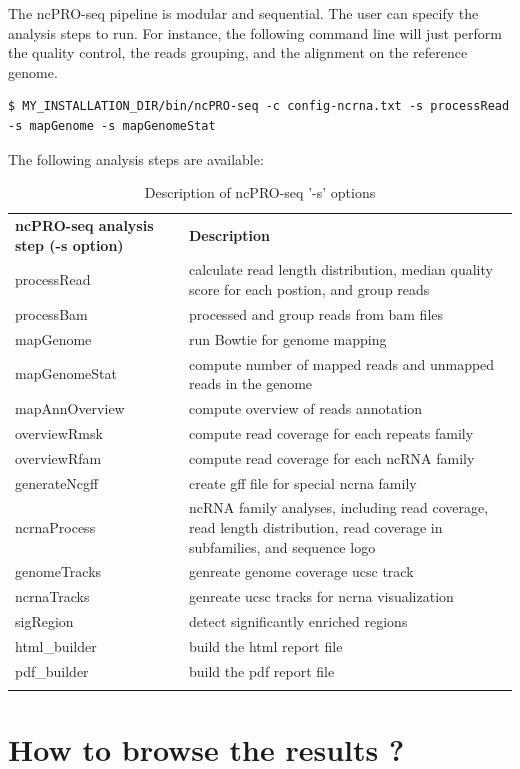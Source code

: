 \documentclass[12pt]{article}
\def \ncpip{ncPRO-seq}
\begin{document}
The \ncpip{} pipeline is modular and sequential. The user can specify the analysis steps to run.
For instance, the following command line will just perform the quality control, the reads grouping, and the alignment on the reference genome.
\begin{verbatim}
$ MY_INSTALLATION_DIR/bin/ncPRO-seq -c config-ncrna.txt -s processRead 
-s mapGenome -s mapGenomeStat 
\end{verbatim}
The following analysis steps are available:
\begin{center}
\begin{longtable}{|p{8cm}|p{8cm}|}
\hline \rowcolor{gray} 
\textbf{\ncpip{} analysis step (-s option)} &	\textbf{Description}\tabularnewline 
processRead &	calculate read length distribution, median quality score for each postion, and group reads\\
processBam &	processed and group reads from bam files\\
mapGenome &	run Bowtie for genome mapping\\
mapGenomeStat&	compute number of mapped reads and unmapped reads in the genome\\
mapAnnOverview & compute overview of reads annotation\\
overviewRmsk &	compute read coverage for each repeats family\\
overviewRfam &	compute read coverage for each ncRNA family\\
generateNcgff &	create gff file for special ncrna family\\
ncrnaProcess&	ncRNA family analyses, including read coverage, read length distribution, read coverage in subfamilies, and sequence logo\\
genomeTracks & genreate genome coverage ucsc track\\
ncrnaTracks & genreate ucsc tracks for ncrna visualization\\
sigRegion &	detect significantly enriched regions\\
html\_builder &	build the html report file\\
pdf\_builder & build the pdf report file\\
\hline
\caption{Description of \ncpip{} '-s' options}
\label{tab:configureoptions}
\end{longtable}
\end{center}

\section{How to browse the results ?}
\label{section:report}
\end{document}
